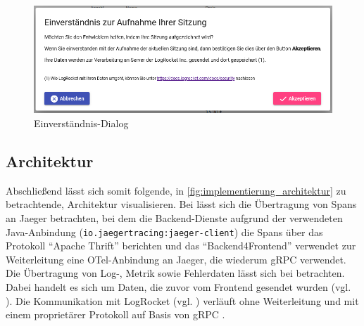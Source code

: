 \begin{figure}[H]
	\centering
	\includegraphics[width=1.00\linewidth]{img/04_erstellung-poc/implementierung_frontend_recording-consent_dialog-inactive.png}
	\caption{Einverständnis-Dialog}
	\label{fig:recording-consent_dialog-inactive}
\end{figure}





\subsection{Architektur}

Abschließend lässt sich somit folgende, in \autoref{fig:implementierung_architektur} zu betrachtende, Architektur visualisieren. Bei  lässt sich die Übertragung von Spans an Jaeger betrachten, bei dem die Backend-Dienste aufgrund der verwendeten Java-Anbindung (\texttt{io\allowbreak{}.\allowbreak{}jaegertracing\allowbreak{}:\allowbreak{}jaeger-client}) die Spans über das Protokoll \enquote{Apache Thrift} \cite{Thrift} berichten und das \enquote{Backend4Frontend} verwendet zur Weiterleitung eine OTel-Anbindung an Jaeger, die wiederum gRPC verwendet. Die Übertragung von Log-, Metrik sowie Fehlerdaten lässt sich bei  betrachten. Dabei handelt es sich um Daten, die zuvor vom Frontend gesendet wurden (vgl. ). Die Kommunikation mit LogRocket (vgl. ) verläuft ohne Weiterleitung und mit einem proprietärer Protokoll auf Basis von gRPC \cite{LogRocketPerformance}.

